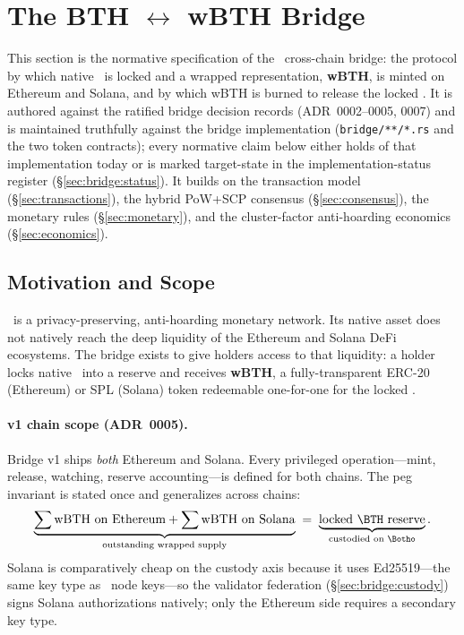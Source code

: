 
\section{The BTH \texorpdfstring{$\leftrightarrow$}{<->} wBTH Bridge}
\label{sec:bridge}

This section is the normative specification of the \Botho\ cross-chain bridge:
the protocol by which native \BTH\ is locked and a wrapped representation,
\textbf{wBTH}, is minted on Ethereum and Solana, and by which wBTH is burned to
release the locked \BTH. It is authored against the ratified bridge
decision records (ADR~0002--0005, 0007) and is maintained truthfully against the
bridge implementation (\texttt{bridge/**/*.rs} and the two token contracts);
every normative claim below either holds of that implementation today or is
marked target-state in the implementation-status register
(\S\ref{sec:bridge:status}). It builds on the transaction model
(\S\ref{sec:transactions}), the hybrid PoW+SCP consensus
(\S\ref{sec:consensus}), the monetary rules (\S\ref{sec:monetary}), and the
cluster-factor anti-hoarding economics (\S\ref{sec:economics}).

\subsection{Motivation and Scope}
\label{sec:bridge:motivation}

\Botho\ is a privacy-preserving, anti-hoarding monetary network. Its native
asset does not natively reach the deep liquidity of the Ethereum and Solana
DeFi ecosystems. The bridge exists to give holders access to that liquidity: a
holder locks native \BTH\ into a reserve and receives \textbf{wBTH}, a
fully-transparent ERC-20 (Ethereum) or SPL (Solana) token redeemable
one-for-one for the locked \BTH.

\paragraph{v1 chain scope (ADR~0005).} Bridge v1 ships \emph{both} Ethereum and
Solana. Every privileged operation---mint, release, watching, reserve
accounting---is defined for both chains. The peg invariant is stated once and
generalizes across chains:
\begin{equation}
\label{eq:bridge:peg}
\underbrace{\sum \text{wBTH on Ethereum} + \sum \text{wBTH on Solana}}_{\text{outstanding wrapped supply}}
\;=\; \underbrace{\text{locked \BTH\ reserve}}_{\text{custodied on \Botho}}.
\end{equation}
Solana is comparatively cheap on the custody axis because it uses Ed25519---the
same key type as \Botho\ node keys---so the validator federation
(\S\ref{sec:bridge:custody}) signs Solana authorizations natively; only the
Ethereum side requires a secondary key type.


